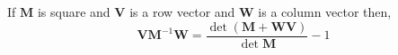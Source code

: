 If $\mathbf{M}$ is square and $\mathbf{V}$ is a row vector and $\mathbf{W}$ is a column vector then,
\[
\mathbf{VM}^{-1}\mathbf{W}=\frac{\det\left(\mathbf{M}+\mathbf{WV}\right)}{\det{\mathbf{M}}}-1
\]
 


\endinput

